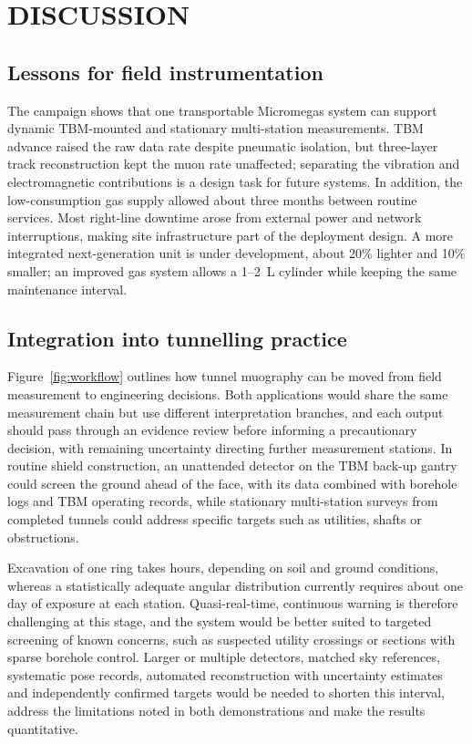 \documentclass{WTC2027}
\begin{document}
\section{DISCUSSION}
\subsection{Lessons for field instrumentation}
The campaign shows that one transportable Micromegas system can support dynamic TBM-mounted and stationary multi-station measurements. TBM advance raised the raw data rate despite pneumatic isolation, but three-layer track reconstruction kept the muon rate unaffected; separating the vibration and electromagnetic contributions is a design task for future systems. In addition, the low-consumption gas supply allowed about three months between routine services. Most right-line downtime arose from external power and network interruptions, making site infrastructure part of the deployment design. A more integrated next-generation unit is under development, about 20\% lighter and 10\% smaller; an improved gas system allows a 1--2~L cylinder while keeping the same maintenance interval.

\subsection{Integration into tunnelling practice}\label{sec:practice}
Figure~\ref{fig:workflow} outlines how tunnel muography can be moved from field measurement to engineering decisions. Both applications would share the same measurement chain but use different interpretation branches, and each output should pass through an evidence review before informing a precautionary decision, with remaining uncertainty directing further measurement stations. In routine shield construction, an unattended detector on the TBM back-up gantry could screen the ground ahead of the face, with its data combined with borehole logs and TBM operating records, while stationary multi-station surveys from completed tunnels could address specific targets such as utilities, shafts or obstructions.

Excavation of one ring takes hours, depending on soil and ground conditions, whereas a statistically adequate angular distribution currently requires about one day of exposure at each station. Quasi-real-time, continuous warning is therefore challenging at this stage, and the system would be better suited to targeted screening of known concerns, such as suspected utility crossings or sections with sparse borehole control. Larger or multiple detectors, matched sky references, systematic pose records, automated reconstruction with uncertainty estimates and independently confirmed targets would be needed to shorten this interval, address the limitations noted in both demonstrations and make the results quantitative.
\end{document}
